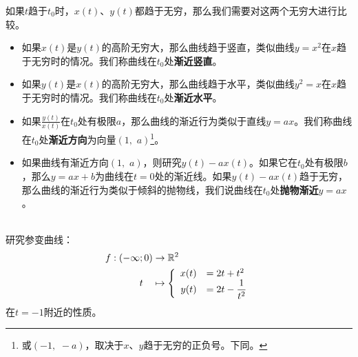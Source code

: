 \documentclass[12pt,UTF8,fontset=none]{ctexbook}
\begin{document}
如果$t$趋于$t_0$时，$x(t)$、$y(t)$都趋于无穷，那么我们需要对这两个无穷大进行比较。
\begin{itemize}
    \item 如果$x(t)$是$y(t)$的高阶无穷大，那么曲线趋于竖直，类似曲线$y = x^2$在$x$趋于无穷时的情况。我们称曲线在$t_0$处\textbf{渐近竖直}。
    \item 如果$y(t)$是$x(t)$的高阶无穷大，那么曲线趋于水平，类似曲线$y^2 = x$在$x$趋于无穷时的情况。我们称曲线在$t_0$处\textbf{渐近水平}。
    \item 如果$\frac{y(t)}{x(t)}$在$t_0$处有极限$a$，那么曲线的渐近行为类似于直线$y = ax$。我们称曲线在$t_0$处\textbf{渐近方向}为向量$(1,\,\,a)$\footnote{或$(-1,\,\,-a)$，取决于$x$、$y$趋于无穷的正负号。下同。}。
    \item 如果曲线有渐近方向$(1, \,\,a)$，则研究$y(t) - ax(t)$。如果它在$t_0$处有极限$b$，那么$y = ax + b$为曲线在$t=0$处的渐近线。如果$y(t) - ax(t)$趋于无穷，那么曲线的渐近行为类似于倾斜的抛物线，我们说曲线在$t_0$处\textbf{抛物渐近}$y = ax$。
\end{itemize}

\begin{et}
    \mbox{} \\
    研究参变曲线：%
    \begin{align*}
        f: (-\infty;0) &\rightarrow \mathbb{R}^2 \\
        t\quad &\mapsto\left\{
            \begin{array}[]{rl}
                x(t) &=2t + t^2 \\
                y(t) &\displaystyle = 2t - \frac{1}{t^2}\\
            \end{array}
        \right.
    \end{align*}
    在$t=-1$附近的性质。
\end{et}
\end{document}
